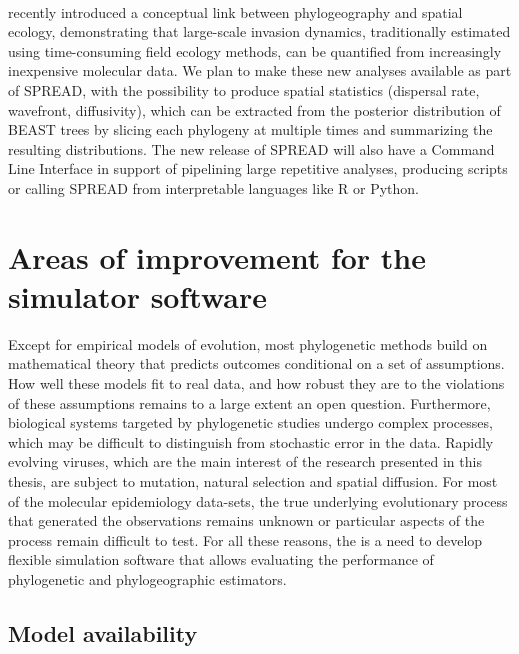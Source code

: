 \paragraph{}
\cite{Pybus2012} recently introduced a conceptual link between phylogeography and spatial ecology, demonstrating that large-scale invasion dynamics, traditionally estimated using time-consuming field ecology methods, can be quantified from increasingly inexpensive molecular data.
We plan to make these new analyses available as part of SPREAD, with the possibility to produce spatial statistics (dispersal rate, wavefront, diffusivity), which can be extracted from the posterior distribution of BEAST trees by slicing each phylogeny at multiple times and summarizing the resulting distributions.
The new release of SPREAD will also have a Command Line Interface in support of pipelining large repetitive analyses, producing scripts or calling SPREAD from interpretable languages like R \citep{RCran} or Python.


\section{Areas of improvement for the {\bussname} simulator software}

Except for empirical models of evolution, most phylogenetic methods build on mathematical theory that predicts outcomes conditional on a set of assumptions.
How well these models fit to real data, and how robust they are to the violations of these assumptions remains to a large extent an open question.
Furthermore, biological systems targeted by phylogenetic studies undergo complex processes, which may be difficult to distinguish from stochastic error in the data.
Rapidly evolving viruses, which are the main interest of the research presented in this thesis, are subject to mutation, natural selection and spatial diffusion.
For most of the molecular epidemiology data-sets, the true underlying evolutionary process that generated the observations remains unknown or particular aspects of the process remain difficult to test.
For all these reasons, the is a need to develop flexible simulation software that allows evaluating the performance of phylogenetic and phylogeographic estimators.

\subsection{Model availability}

